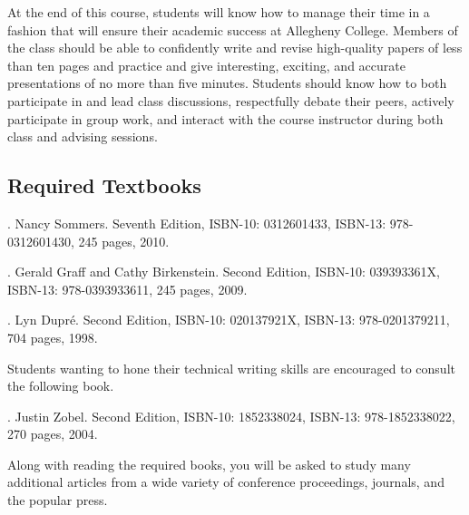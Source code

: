 At the end of this course, students will know how to manage their time in a fashion that will ensure their academic
success at Allegheny College.  Members of the class should be able to confidently write and revise high-quality papers
of less than ten pages and practice and give interesting, exciting, and accurate presentations of no more than five
minutes.  Students should know how to both participate in and lead class discussions, respectfully debate their peers,
actively participate in group work, and interact with the course instructor during both class and advising sessions.

\subsection*{Required Textbooks}


  . Nancy Sommers. Seventh Edition,  ISBN-10: 0312601433, ISBN-13: 978-0312601430,
  245 pages, 2010.


  . Gerald Graff and Cathy Birkenstein. Second Edition,
  ISBN-10: 039393361X, ISBN-13: 978-0393933611, 245 pages, 2009.


. Lyn Dupr\'e. Second Edition,  ISBN-10: 020137921X,
ISBN-13: 978-0201379211, 704 pages, 1998.

\noindent
Students wanting to hone their technical writing skills are encouraged to consult the following book.

.  Justin Zobel. Second Edition,  ISBN-10: 1852338024, ISBN-13:
978-1852338022, 270 pages, 2004.

\noindent
Along with reading the required books, you will be asked to study many additional articles from a wide variety of
conference proceedings, journals, and the popular press.

